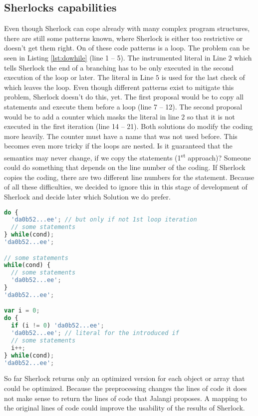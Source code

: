 \subsection{Sherlocks capabilities}
Even though Sherlock can cope already with many complex program structures, there are still
 some patterns known, where Sherlock is either too restrictive or doesn't get them right. 
On of these code patterns is a  loop. The problem can be seen in Listing
 \ref{lst:dowhile} (line 1 -- 5). The instrumented literal in Line $2$ which tells 
 Sherlock the end of a branching has to be only executed in the second execution of the
 loop or later. The literal in Line $5$ is used for the last check of  which 
 leaves the loop. Even though different patterns exist to mitigate this problem, Sherlock
 doesn't do this, yet. The first proposal would be to copy all statements and execute 
 them before a  loop (line 7 -- 12). The second proposal would be to add a 
 counter which masks the literal in line $2$ so that it is not executed in the first 
 iteration (line 14 -- 21). Both solutions do modify the coding more heavily. The counter
 must have a name that was not used before. This becomes even more tricky if the loops are
 nested. Is it guaranteed that the semantics may never change, if we copy the statements
 (1\textsuperscript{st} approach)? Someone could do something that depends on the line 
 number of the coding. If Sherlock copies the coding, there are two different line 
 numbers for the statement. Because of all these difficulties, we decided to ignore 
 this in this stage of development of Sherlock and decide later which Solution we do prefer.

\begin{lstlisting}[label=lst:dowhile,caption=Example for do-while loop and how Sherlock can
 handle them in future iterations.,language=Javascript]
do {
  'da0b52...ee'; // but only if not 1st loop iteration
  // some statements
} while(cond);
'da0b52...ee';

// some statements
while(cond) {
  // some statements
  'da0b52...ee';
}
'da0b52...ee';

var i = 0;
do {
  if (i != 0) 'da0b52...ee';
  'da0b52...ee'; // literal for the introduced if 
  // some statements
  i++;
} while(cond);
'da0b52...ee';
\end{lstlisting}
So far Sherlock returns only an optimized version for each object or array that could
be optimized. Because the preprocessing changes the lines of code it does not make 
sense to return the lines of code that Jalangi proposes. A mapping to the original
lines of code could improve the usability of the results of Sherlock.

